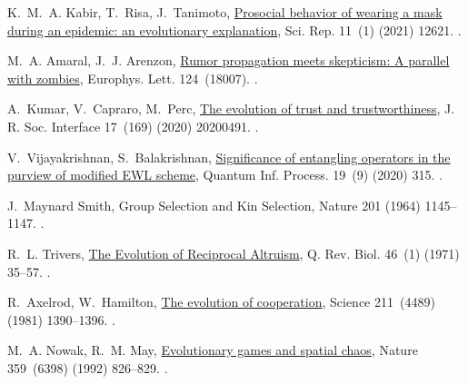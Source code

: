 \documentclass[5p,review]{elsarticle}
\begin{document}
\begin{thebibliography}{10}
K.~M.~A. Kabir, T.~Risa, J.~Tanimoto,
  \href{http://www.nature.com/articles/s41598-021-92094-2}{{Prosocial behavior
  of wearing a mask during an epidemic: an evolutionary explanation}}, Sci.
  Rep. 11~(1) (2021) 12621.
\newblock \href {http://dx.doi.org/10.1038/s41598-021-92094-2}
  {}.


M.~A. Amaral, J.~J. Arenzon,
  \href{http://iopscience.iop.org/article/10.1209/0295-5075/124/18007}{Rumor
  propagation meets skepticism: {A} parallel with zombies}, Europhys. Lett.
  124~(18007).
\newblock \href {http://dx.doi.org/10.1209/0295-5075/124/18007}
  {}.

A.~Kumar, V.~Capraro, M.~Perc,
  \href{https://royalsocietypublishing.org/doi/10.1098/rsif.2020.0491}{{The
  evolution of trust and trustworthiness}}, J. R. Soc. Interface 17~(169)
  (2020) 20200491.
\newblock \href {http://dx.doi.org/10.1098/rsif.2020.0491}
  {}.

V.~Vijayakrishnan, S.~Balakrishnan,
  \href{http://link.springer.com/10.1007/s11128-020-02827-x}{{Significance of
  entangling operators in the purview of modified EWL scheme}}, Quantum Inf.
  Process. 19~(9) (2020) 315.
\newblock \href {http://dx.doi.org/10.1007/s11128-020-02827-x}
  {}.

J.~{Maynard Smith}, {Group Selection and Kin Selection}, Nature 201 (1964)
  1145--1147.
\newblock \href {https://doi.org/10.1038/2011145a0}
  {}.



R.~L. Trivers, \href{http://www.journals.uchicago.edu/doi/10.1086/406755}{{The
  Evolution of Reciprocal Altruism}}, Q. Rev. Biol. 46~(1) (1971) 35--57.
\newblock \href {http://dx.doi.org/10.1086/406755} {}.

R.~Axelrod, W.~Hamilton,
  \href{http://science.sciencemag.org/content/211/4489/1390
  https://www.sciencemag.org/lookup/doi/10.1126/science.7466396}{{The evolution
  of cooperation}}, Science 211~(4489) (1981) 1390--1396.
\newblock \href {http://dx.doi.org/10.1126/science.7466396}
  {}.

M.~A. Nowak, R.~M. May,
  \href{http://www.nature.com/doifinder/10.1038/359826a0}{{Evolutionary games
  and spatial chaos}}, Nature 359~(6398) (1992) 826--829.
\newblock \href {http://dx.doi.org/10.1038/359826a0}  {}.


\end{thebibliography}
\end{document}
